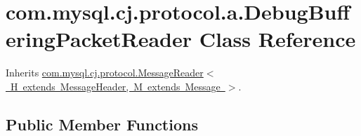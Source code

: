 \hypertarget{classcom_1_1mysql_1_1cj_1_1protocol_1_1a_1_1_debug_buffering_packet_reader}{}\section{com.\+mysql.\+cj.\+protocol.\+a.\+Debug\+Buffering\+Packet\+Reader Class Reference}
\label{classcom_1_1mysql_1_1cj_1_1protocol_1_1a_1_1_debug_buffering_packet_reader}


Inherits \mbox{\hyperlink{interfacecom_1_1mysql_1_1cj_1_1protocol_1_1_message_reader}{com.\+mysql.\+cj.\+protocol.\+Message\+Reader$<$ H extends Message\+Header, M extends Message $>$}}.

\subsection*{Public Member Functions}
